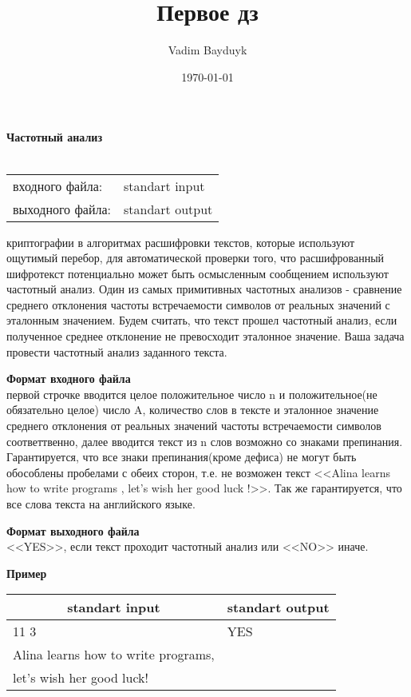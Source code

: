 \documentclass[10pt, a4paper]{article}
\title{Первое дз}
\author{Vadim Bayduyk}
\date{\today}
\begin{document}
{\selectfont
\noindent\LARGE\textbf{Частотный анализ}\\\\
\normalsize
\begin{tabular}{ll}
 входного файла: & standart input\\
 выходного файла: & standart output\\
\end{tabular}

 криптографии в алгоритмах расшифровки текстов, которые используют ощутимый перебор, для автоматической проверки того, что расшифрованный шифротекст потенциально может быть осмысленным сообщением используют частотный анализ. Один из самых примитивных частотных анализов  - сравнение среднего отклонения частоты встречаемости символов от реальных значений с эталонным значением. Будем считать, что текст прошел частотный анализ, если полученное среднее отклонение не превосходит эталонное значение. Ваша задача  провести частотный анализ заданного текста.

\noindent\large\textbf{Формат входного файла}\\
 первой строчке вводится целое положительное число n и положительное(не обязательно целое) число A, количество слов в тексте и эталонное значение среднего отклонения от реальных значений частоты встречаемости символов соответтвенно, далее вводится текст из n слов возможно со знаками препинания. Гарантируется, что все знаки препинания(кроме дефиса) не могут быть обособлены пробелами с обеих сторон, т.е. не возможен текст <<Alina learns how to write programs  , let's wish her good luck !>>. Так же гарантируется, что все слова текста на английского языке. 

\noindent\large\textbf{Формат выходного файла}\\ <<YES>>, если текст проходит частотный анализ или <<NO>> иначе.

\noindent\large\textbf{Пример}\normalsize

\noindent\begin{tabular}{|p{}|p{}|}
\hline
\multicolumn{1}{|c|}{standart input} & \multicolumn{1}{c|}{standart output}\\\hline
 11 3 & YES \\
 Alina learns how to write programs, & \\
let's wish her good luck! &\\\hline
\end{tabular}

}
\end{document}
